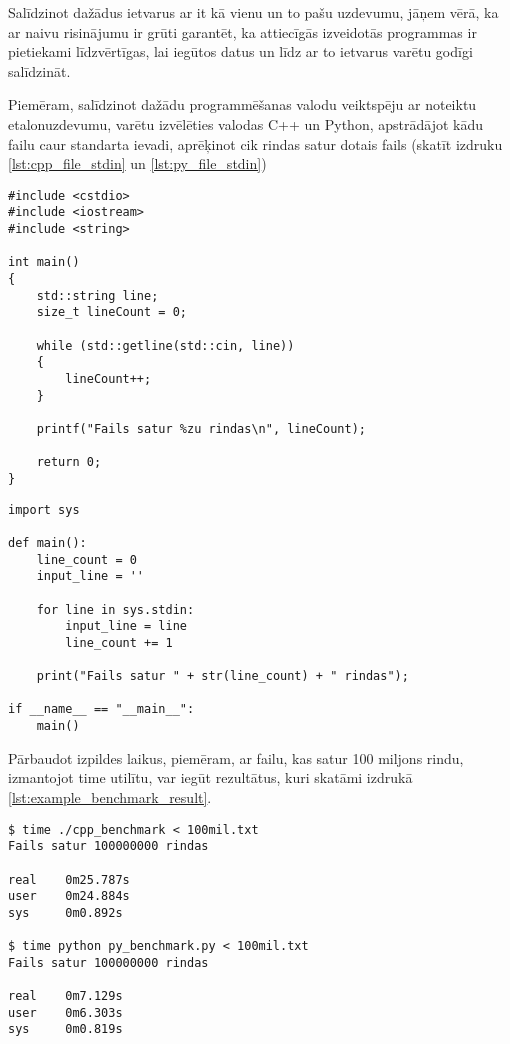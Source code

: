 Salīdzinot dažādus ietvarus ar it kā vienu un to pašu uzdevumu, jāņem vērā, ka
ar naivu risinājumu ir grūti garantēt, ka attiecīgās izveidotās programmas ir
pietiekami līdzvērtīgas, lai iegūtos datus un līdz ar to ietvarus varētu godīgi
salīdzināt.

Piemēram, salīdzinot dažādu programmēšanas valodu veiktspēju ar noteiktu
etalonuzdevumu, varētu izvēlēties valodas C++ un Python, apstrādājot kādu failu
caur standarta ievadi, aprēķinot cik rindas satur dotais fails (skatīt izdruku
\ref{lst:cpp_file_stdin} un \ref{lst:py_file_stdin})

\begin{lstlisting}[caption={Vienkārša faila apstrāde valodā C++ caur standarta ievadi},
  label=lst:cpp_file_stdin,
  captionpos=b
]
#include <cstdio>
#include <iostream>
#include <string>

int main()
{
	std::string line;
	size_t lineCount = 0;

	while (std::getline(std::cin, line))
	{
		lineCount++;
	}

	printf("Fails satur %zu rindas\n", lineCount);

	return 0;
}
\end{lstlisting}


\begin{lstlisting}[caption={Vienkārša faila apstrāde valodā Python caur standarta ievadi},
  label=lst:py_file_stdin,
  captionpos=b
]
import sys 

def main():
    line_count = 0
    input_line = ''

    for line in sys.stdin:
        input_line = line
        line_count += 1

    print("Fails satur " + str(line_count) + " rindas");

if __name__ == "__main__":
    main()
\end{lstlisting}

Pārbaudot izpildes laikus, piemēram, ar failu, kas satur 100 miljons rindu,
izmantojot time\cite{time_man_page} utilītu, var iegūt rezultātus, kuri skatāmi
izdrukā \ref{lst:example_benchmark_result}.

\begin{lstlisting}[caption={Etalonuzdevuma rezultāti failam ar 100 miljoniem rindu},
  label=lst:example_benchmark_result,
  captionpos=b
]
$ time ./cpp_benchmark < 100mil.txt 
Fails satur 100000000 rindas

real    0m25.787s
user    0m24.884s
sys     0m0.892s

$ time python py_benchmark.py < 100mil.txt 
Fails satur 100000000 rindas

real    0m7.129s
user    0m6.303s
sys     0m0.819s
\end{lstlisting}

